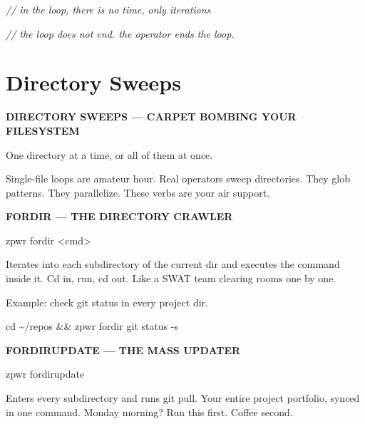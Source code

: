 \documentclass[11pt,a4paper,twoside]{book}
\begin{document}
{\small\itshape\color{dimtext} // in the loop, there is no time, only iterations}

{\small\itshape\color{dimtext} // the loop does not end. the operator ends the loop.}


\vspace{16pt}

\section{Directory Sweeps}


\vspace{10pt}
{\large\bfseries\color{neoncyan} DIRECTORY SWEEPS — CARPET BOMBING YOUR FILESYSTEM}\vspace{6pt}

One directory at a time, or all of them at once.

Single-file loops are amateur hour. Real operators sweep directories. They glob patterns. They parallelize. These verbs are your air support.


\vspace{12pt}
{\bfseries\color{neonyellow} FORDIR — THE DIRECTORY CRAWLER}\vspace{4pt}

\begin{codebox}
\color{neongreen}zpwr fordir <cmd>\\
\end{codebox}

Iterates into each subdirectory of the current dir and executes the command inside it. Cd in, run, cd out. Like a SWAT team clearing rooms one by one.

Example: check git status in every project dir.

\begin{codebox}
\color{neongreen}cd \textasciitilde{}/repos \&\& zpwr fordir git status -s\\
\end{codebox}


\vspace{12pt}
{\bfseries\color{neonyellow} FORDIRUPDATE — THE MASS UPDATER}\vspace{4pt}

\begin{codebox}
\color{neongreen}zpwr fordirupdate\\
\end{codebox}

Enters every subdirectory and runs git pull. Your entire project portfolio, synced in one command. Monday morning? Run this first. Coffee second.
\end{document}

